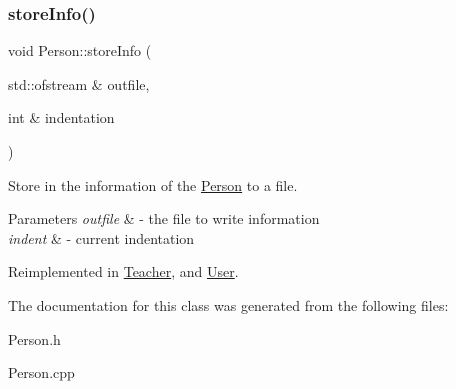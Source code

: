 \subsubsection{\texorpdfstring{store\+Info()}{storeInfo()}}
{\footnotesize\ttfamily void Person\+::store\+Info (\begin{DoxyParamCaption}\item[{std\+::ofstream \&}]{outfile,  }\item[{int \&}]{indentation }\end{DoxyParamCaption})\hspace{0.3cm}{\ttfamily [virtual]}}



Store in the information of the \mbox{\hyperlink{class_person}{Person}} to a file. 


\begin{DoxyParams}{Parameters}
{\em outfile} & -\/ the file to write information \\
\hline
{\em indent} & -\/ current indentation \\
\hline
\end{DoxyParams}


Reimplemented in \mbox{\hyperlink{class_teacher_a2ece0d60fa7ec4aaf93333aa0be0d25f}{Teacher}}, and \mbox{\hyperlink{class_user_aac5ff0f6899f3ce56d1b2d12ed557c79}{User}}.



The documentation for this class was generated from the following files\+:\begin{DoxyCompactItemize}
\item 
Person.\+h\item 
Person.\+cpp\end{DoxyCompactItemize}
